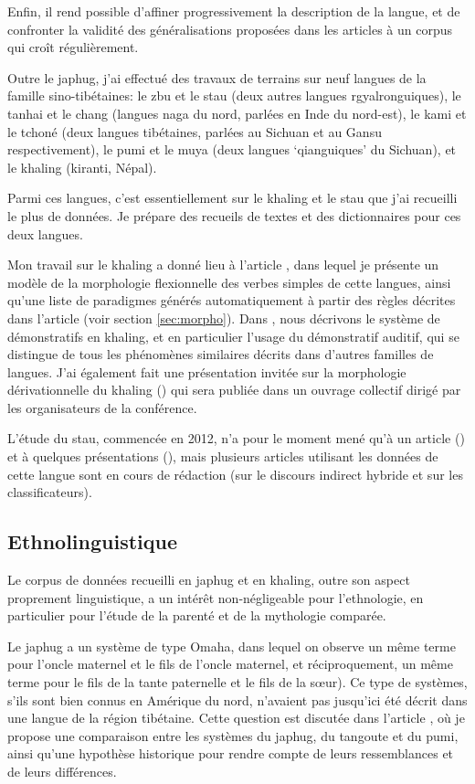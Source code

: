 \documentclass[oldfontcommands,oneside,a4paper,11pt]{article}
\begin{document}
 Enfin, il rend possible d'affiner progressivement la description de la langue, et de confronter la validité des généralisations proposées dans les articles à un corpus qui croît régulièrement. 

Outre le japhug, j'ai effectué des travaux de terrains sur neuf langues de la famille sino-tibétaines: le zbu et le stau (deux autres langues rgyalronguiques), le tanhai et le chang (langues naga du nord, parlées en Inde du nord-est), le kami et le tchoné (deux langues tibétaines, parlées au Sichuan et au Gansu respectivement), le pumi et le muya (deux langues `qianguiques' du Sichuan), et le khaling (kiranti, Népal).

Parmi ces langues, c'est essentiellement sur le khaling et le stau que j'ai recueilli le plus de données. Je prépare des recueils de textes et des  dictionnaires pour ces deux langues.

Mon travail sur le khaling a donné lieu à l'article \citet{jacques12khaling}, dans lequel je présente un modèle de la morphologie flexionnelle des verbes simples de cette langues, ainsi qu'une liste de paradigmes générés automatiquement à partir des règles décrites dans l'article (voir section \ref{sec:morpho}). Dans \citet{jacques14auditory}, nous décrivons le système de démonstratifs en khaling, et en particulier l'usage du démonstratif auditif, qui se distingue de tous les phénomènes similaires décrits dans d'autres familles de langues. J'ai également fait une présentation invitée sur la morphologie dérivationnelle du khaling (\citealt{jacques13derivational.khaling}) qui sera publiée dans un ouvrage collectif dirigé par les organisateurs de la conférence.

L'étude du stau, commencée en 2012, n'a pour le moment mené qu'à un article (\citealt{jacques14rtau}) et à quelques présentations (\citealt{antonov14rtau}), mais plusieurs articles utilisant les données de cette langue sont en cours de rédaction (sur le discours indirect hybride et sur les classificateurs).
 
\subsection{Ethnolinguistique}  \label{sec:ethno}
Le corpus de données recueilli en japhug et en khaling, outre son aspect proprement linguistique, a un intérêt non-négligeable pour l'ethnologie, en particulier pour l'étude de la parenté et de la mythologie comparée.

Le japhug a un système de type Omaha, dans lequel on observe un même terme pour l'oncle maternel et le fils de l'oncle maternel, et réciproquement, un même terme pour le fils de la tante paternelle et le fils de la sœur). Ce type de systèmes, s'ils sont bien connus en Amérique du nord, n'avaient pas jusqu'ici   été décrit dans une langue de la région tibétaine. Cette question est discutée dans l'article \citet{jacques11kinship}, où je propose une comparaison entre les systèmes du japhug, du tangoute et du pumi, ainsi qu'une hypothèse historique pour rendre compte de leurs ressemblances et de leurs différences.
\end{document}
